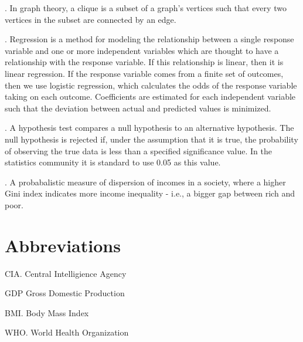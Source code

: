 \documentclass[oneside,12pt]{report}
\begin{document}
\vspace{8pt} . In graph theory, a clique is a subset of a graph's vertices such that every two vertices in the subset are connected by an edge.

\vspace{8pt} . Regression is a method for modeling the relationship between a single response variable and one or more independent variables which are thought to have a relationship with the response variable. If this relationship is linear, then it is linear regression. If the response variable comes from a finite set of outcomes, then we use logistic regression, which calculates the odds of the response variable taking on each outcome. Coefficients are estimated for each independent variable such that the deviation between actual and predicted values is minimized.

\vspace{8pt} . A hypothesis test compares a null hypothesis to an alternative hypothesis. The null hypothesis is rejected if, under the assumption that it is true, the probability of observing the true data is less than a specified significance value. In the statistics community it is standard to use 0.05 as this value.

\vspace{8pt} . A probabalistic measure of dispersion of incomes in a society, where a higher Gini index indicates more income inequality - i.e., a bigger gap between rich and poor.


\chapter{Abbreviations}\label{Abbreviations}


\noindent CIA. Central Intelligience Agency
\vspace{5pt}

\noindent GDP Gross Domestic Production

\vspace{5pt}

\noindent BMI. Body Mass Index

\vspace{5pt}

\noindent WHO. World Health Organization

\vspace{5pt}




\renewcommand\bibname{Selected Bibliography Including Cited Works}
\nocite{*}  %

\end{document}
